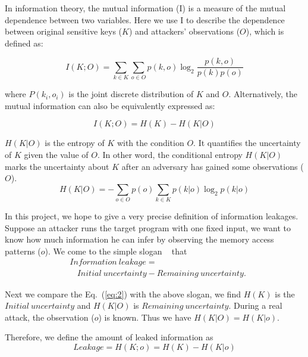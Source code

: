 In information theory, the mutual information (I) is a measure of the mutual
dependence between two variables. Here we use I to describe the
dependence between original sensitive keys ($K$) and attackers' observations ($O$), 
which is defined as:

\begin{equation} \label{eq:1}
    I(K;O) = \sum_{k {\in} K}{\sum_{o {\in} O}{p(k, o)\log_2\frac{p(k, o)}{p(k)p(o)}}}
\end{equation}

where $P(k_i, o_i)$ is the joint discrete distribution of $K$ and $O$.
Alternatively, the mutual information can also be equivalently expressed as:

\begin{equation} \label{eq:2}
    I(K;O) = H(K) - H(K|O)
\end{equation}

$H(K|O)$ is the entropy of $K$ with the condition $O$. It quantifies the
uncertainty of $K$ given the value of $O$. In other word, the conditional
entropy $H(K|O)$ marks the uncertainty about $K$ after an adversary has gained
some observations ($O$).
\begin{equation}
    H(K|O) = - \sum_{o {\in} O} {p(o) \sum_{k {\in} K}{p(k|o)\log_2p(k|o)}}
\end{equation}

In this project, we hope to give a very precise definition of information
leakages. Suppose an attacker runs the target program with one
fixed input, we want to know how much information he can infer by observing the
memory access patterns ($o$). We come to the simple slogan
~\cite{10.1007/978-3-642-00596-1_21} %
that
\begin{align*}
     & \mathit{Information\ leakage} =                                         \\
     & ~~~~ \mathit{Initial\ uncertainty} - \mathit{Remaining\ uncertainty}.
\end{align*}

Next we compare the Eq.~(\ref{eq:2}) with the above slogan, we find $H(K)$
is the $\mathit{Initial\ uncertainty}$ and $H(K|O)$ is $\mathit{Remaining\
uncertainty}$. During a real attack, the observation ($o$) is known.  Thus we
have $H(K|O) = H(K|o)$.

Therefore, we define the amount of leaked information as
\begin{displaymath}
    Leakage = H(K;o) = H(K) - H(K|o)
\end{displaymath}

